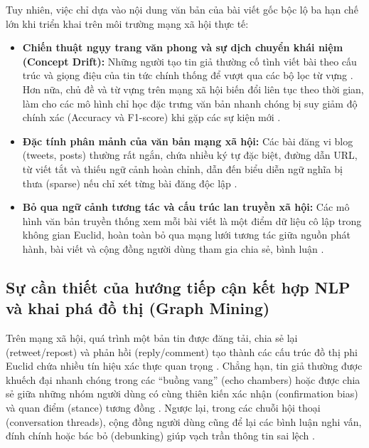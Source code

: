 \documentclass[11pt,a4paper]{extreport}
\begin{document}
Tuy nhiên, việc chỉ dựa vào nội dung văn bản của bài viết gốc bộc lộ ba hạn chế lớn khi triển khai trên môi trường mạng xã hội thực tế:
\begin{itemize}
    \item \textbf{Chiến thuật ngụy trang văn phong và sự dịch chuyển khái niệm (Concept Drift):} Những người tạo tin giả thường cố tình viết bài theo cấu trúc và giọng điệu của tin tức chính thống để vượt qua các bộ lọc từ vựng \cite{noauthor_comparative_2024}. Hơn nữa, chủ đề và từ vựng trên mạng xã hội biến đổi liên tục theo thời gian, làm cho các mô hình chỉ học đặc trưng văn bản nhanh chóng bị suy giảm độ chính xác (Accuracy và F1-score) khi gặp các sự kiện mới \cite{noauthor_improving_2025}.
    \item \textbf{Đặc tính phân mảnh của văn bản mạng xã hội:} Các bài đăng vi blog (tweets, posts) thường rất ngắn, chứa nhiều ký tự đặc biệt, đường dẫn URL, từ viết tắt và thiếu ngữ cảnh hoàn chỉnh, dẫn đến biểu diễn ngữ nghĩa bị thưa (sparse) nếu chỉ xét từng bài đăng độc lập \cite{noauthor_integrating_2025, noauthor_co-attention_2025}.
    \item \textbf{Bỏ qua ngữ cảnh tương tác và cấu trúc lan truyền xã hội:} Các mô hình văn bản truyền thống xem mỗi bài viết là một điểm dữ liệu cô lập trong không gian Euclid, hoàn toàn bỏ qua mạng lưới tương tác giữa nguồn phát hành, bài viết và cộng đồng người dùng tham gia chia sẻ, bình luận \cite{noauthor_disinformation_2024, noauthor_dual_2025, zhang_rumor_2024}.
\end{itemize}

\subsection{Sự cần thiết của hướng tiếp cận kết hợp NLP và khai phá đồ thị (Graph Mining)}
Trên mạng xã hội, quá trình một bản tin được đăng tải, chia sẻ lại (retweet/repost) và phản hồi (reply/comment) tạo thành các cấu trúc đồ thị phi Euclid chứa nhiều tín hiệu xác thực quan trọng \cite{noauthor_fake_2023, zhang_rumor_2024}. Chẳng hạn, tin giả thường được khuếch đại nhanh chóng trong các ``buồng vang'' (echo chambers) hoặc được chia sẻ giữa những nhóm người dùng có cùng thiên kiến xác nhận (confirmation bias) và quan điểm (stance) tương đồng \cite{noauthor_exploiting_2024, noauthor_dual_2025}. Ngược lại, trong các chuỗi hội thoại (conversation threads), cộng đồng người dùng cũng để lại các bình luận nghi vấn, đính chính hoặc bác bỏ (debunking) giúp vạch trần thông tin sai lệch \cite{noauthor_wsdms_2023, zhang_rumor_2023}.
\end{document}
